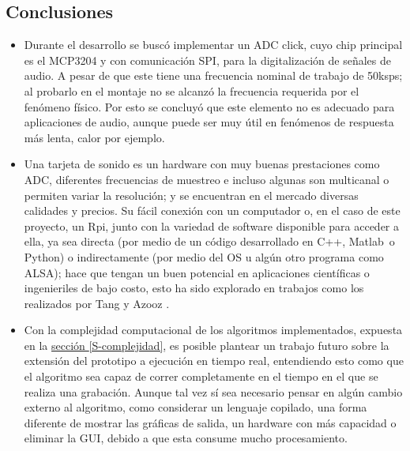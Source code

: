 \documentclass[11pt,lettersize]{article} %
\newcommand{\seccion}[1]{\hyperref[{#1}]{sección \ref*{#1}}}
\begin{document}
\subsection{Conclusiones}
\begin{itemize}
	\item  Durante el desarrollo se buscó implementar un ADC click, cuyo chip principal es el MCP3204 y con comunicación SPI, para la digitalización de señales de audio. A pesar de que este tiene una frecuencia nominal de trabajo de 50ksps; al probarlo en el montaje no se alcanzó la frecuencia requerida por el fenómeno físico. Por esto se concluyó que este elemento no es adecuado para aplicaciones de audio, aunque puede ser muy útil en fenómenos de respuesta más lenta, calor por ejemplo.
	
	\item Una tarjeta de sonido es un hardware con muy buenas prestaciones como ADC, diferentes frecuencias de muestreo e incluso algunas son multicanal o permiten variar la resolución; y se encuentran en el mercado diversas calidades y precios. Su fácil conexión con un computador o, en el caso de este proyecto, un Rpi, junto con la variedad de software disponible para acceder a ella, ya sea directa (por medio de un código desarrollado en C++, Matlab\textregistered\ o Python) o indirectamente (por medio del OS u algún otro programa como ALSA); hace que tengan un buen potencial en aplicaciones científicas o ingenieriles de bajo costo, esto ha sido explorado en trabajos como los realizados por Tang \cite{Tang2005} y Azooz \cite{Azooz2006}.

	\item Con la complejidad computacional de los algoritmos implementados, expuesta en la \seccion{S-complejidad}, es posible plantear un trabajo futuro sobre la extensión del prototipo a ejecución en tiempo real, entendiendo esto como que el algoritmo sea capaz de correr completamente en el tiempo en el que se realiza una grabación. Aunque tal vez sí sea necesario pensar en algún cambio externo al algoritmo, como considerar un lenguaje copilado, una forma diferente de mostrar las gráficas de salida, un hardware con más capacidad o eliminar la GUI, debido a que esta consume mucho procesamiento.



\end{itemize}
\end{document}
